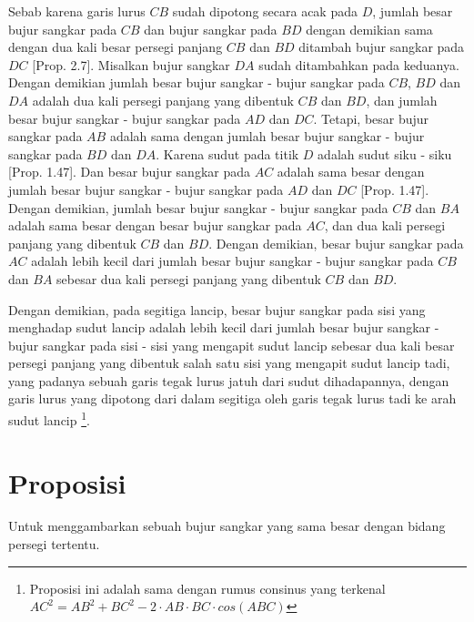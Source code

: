 \documentclass[a4paper]{book}
\begin{document}
Sebab karena garis lurus $CB$ sudah dipotong secara acak pada $D$, jumlah 
besar bujur sangkar pada $CB$ dan bujur sangkar pada $BD$ dengan demikian
sama dengan dua kali besar persegi panjang $CB$ dan $BD$ ditambah  bujur 
sangkar pada $DC$ [Prop. 2.7]. Misalkan bujur sangkar $DA$ sudah ditambahkan
pada keduanya. Dengan demikian jumlah besar bujur sangkar - bujur sangkar pada
$CB$, $BD$ dan $DA$ adalah dua kali persegi panjang yang dibentuk $CB$ dan 
$BD$, dan jumlah besar bujur sangkar - bujur sangkar pada $AD$ dan $DC$. 
Tetapi, besar bujur sangkar pada $AB$ adalah sama dengan jumlah besar bujur
sangkar - bujur sangkar pada $BD$ dan $DA$. Karena sudut pada titik $D$ adalah
sudut siku - siku [Prop. 1.47]. Dan besar bujur sangkar pada $AC$ adalah
sama besar dengan jumlah besar bujur sangkar - bujur sangkar pada $AD$ dan 
$DC$ [Prop. 1.47]. Dengan demikian, jumlah besar bujur sangkar - bujur sangkar
pada $CB$ dan $BA$ adalah sama besar dengan besar bujur sangkar pada $AC$, dan
dua kali persegi panjang yang dibentuk $CB$ dan $BD$. Dengan demikian, besar
bujur sangkar pada $AC$ adalah lebih kecil dari jumlah besar bujur sangkar 
- bujur sangkar pada $CB$ dan $BA$ sebesar dua kali persegi panjang yang
dibentuk $CB$ dan $BD$.

Dengan demikian, pada segitiga lancip, besar bujur sangkar pada sisi yang
menghadap sudut lancip adalah lebih kecil dari jumlah besar bujur sangkar - 
bujur sangkar pada sisi - sisi yang mengapit sudut lancip sebesar dua kali
besar persegi panjang yang dibentuk salah satu sisi yang mengapit sudut
lancip tadi, yang padanya sebuah garis tegak lurus jatuh dari sudut 
dihadapannya, dengan garis lurus yang dipotong dari dalam segitiga oleh garis
tegak lurus tadi ke arah sudut lancip \footnote{Proposisi ini adalah sama 
dengan rumus consinus yang terkenal 
$AC^2 = AB^2 + BC^2 - 2\cdot AB\cdot BC\cdot cos(ABC)$}.


\section*{\centering Proposisi \thesection} 
Untuk menggambarkan sebuah bujur sangkar yang  sama besar dengan bidang 
persegi tertentu.
\end{document}
